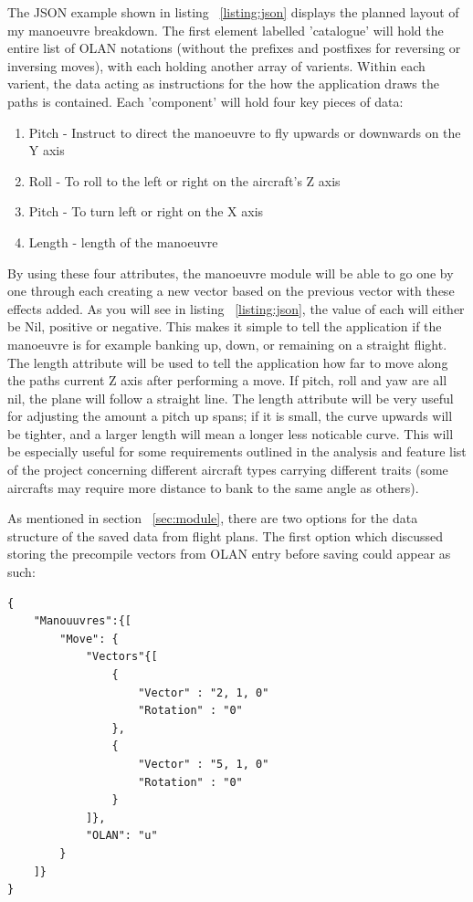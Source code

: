 The JSON example shown in listing ~\ref{listing:json} displays the planned layout of my manoeuvre breakdown. The first element labelled 'catalogue' will hold the entire list of OLAN notations (without the prefixes and postfixes for reversing or inversing moves), with each holding another array of varients. Within each varient, the data acting as instructions for the how the application draws the paths is contained. Each 'component' will hold four key pieces of data:

\begin{enumerate}
	\item Pitch - Instruct to direct the manoeuvre to fly upwards or downwards on the Y axis
	\item Roll - To roll to the left or right on the aircraft's Z axis
	\item Pitch - To turn left or right on the X axis
	\item Length - length of the manoeuvre
\end{enumerate}

By using these four attributes, the manoeuvre module will be able to go one by one through each creating a new vector based on the previous vector with these effects added. As you will see in listing ~\ref{listing:json}, the value of each will either be Nil, positive or negative. This makes it simple to tell the application if the manoeuvre is for example banking up, down, or remaining on a straight flight. The length attribute will be used to tell the application how far to move along the paths current Z axis after performing a move. If pitch, roll and yaw are all nil, the plane will follow a straight line. The length attribute will be very useful for adjusting the amount a pitch up spans; if it is small, the curve upwards will be tighter, and a larger length will mean a longer less noticable curve. This will be especially useful for some requirements outlined in the analysis and feature list of the project concerning different aircraft types carrying different traits (some aircrafts may require more distance to bank to the same angle as others).

As mentioned in section ~\ref{sec:module}, there are two options for the data structure of the saved data from flight plans. The first option which discussed storing the precompile vectors from OLAN entry before saving could appear as such:

\lstset{language=JavaScript}
\medskip
\begin{lstlisting}[caption=A JSON means of holding break downs of manouvres with each one holding information on different varients of the move such as inverse and reverse and description of the OLAN notation]
{
	"Manouuvres":{[
		"Move": {
			"Vectors"{[
				{
					"Vector" : "2, 1, 0"
					"Rotation" : "0"
				},
				{
					"Vector" : "5, 1, 0"
					"Rotation" : "0"
				}
			]},
			"OLAN": "u"
		}
	]}
}
\end{lstlisting}
\label{listing:json}

